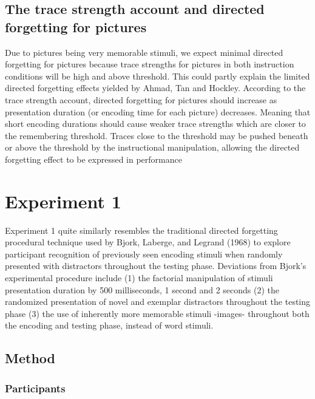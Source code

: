 \documentclass[
  english,
  man,floatsintext]{apa6}
\begin{document}
\hypertarget{the-trace-strength-account-and-directed-forgetting-for-pictures}{%
\subsection{The trace strength account and directed forgetting for pictures}\label{the-trace-strength-account-and-directed-forgetting-for-pictures}}

Due to pictures being very memorable stimuli, we expect minimal directed forgetting for pictures because trace strengths for pictures in both instruction conditions will be high and above threshold. This could partly explain the limited directed forgetting effects yielded by Ahmad, Tan and Hockley. According to the trace strength account, directed forgetting for pictures should increase as presentation duration (or encoding time for each picture) decreases. Meaning that short encoding durations should cause weaker trace strengths which are closer to the remembering threshold. Traces close to the threshold may be pushed beneath or above the threshold by the instructional manipulation, allowing the directed forgetting effect to be expressed in performance

\hypertarget{experiment-1}{%
\section{Experiment 1}\label{experiment-1}}

Experiment 1 quite similarly resembles the traditional directed forgetting procedural technique used by Bjork, Laberge, and Legrand (1968) to explore participant recognition of previously seen encoding stimuli when randomly presented with distractors throughout the testing phase. Deviations from Bjork's experimental procedure include (1) the factorial manipulation of stimuli presentation duration by 500 milliseconds, 1 second and 2 seconds (2) the randomized presentation of novel and exemplar distractors throughout the testing phase (3) the use of inherently more memorable stimuli -images- throughout both the encoding and testing phase, instead of word stimuli.

\hypertarget{method}{%
\subsection{Method}\label{method}}

\hypertarget{participants}{%
\subsubsection{Participants}\label{participants}}
\end{document}
